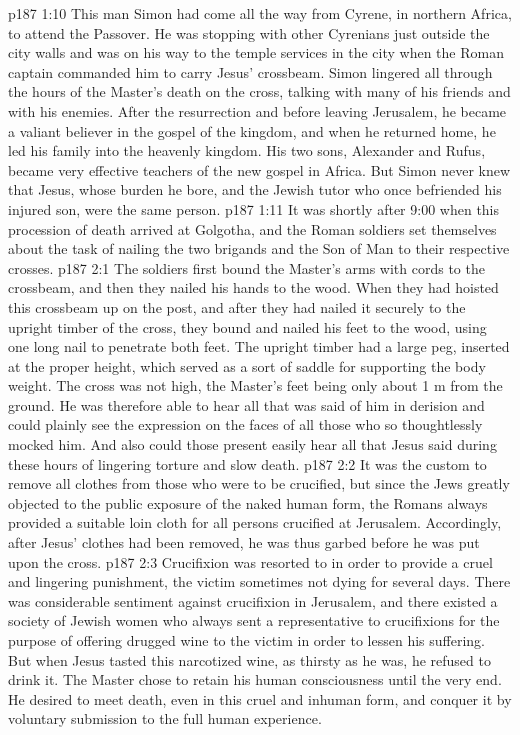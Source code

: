 \vs p187 1:10 \pc This man Simon had come all the way from Cyrene, in northern Africa, to attend the Passover. He was stopping with other Cyrenians just outside the city walls and was on his way to the temple services in the city when the Roman captain commanded him to carry Jesus’ crossbeam. Simon lingered all through the hours of the Master’s death on the cross, talking with many of his friends and with his enemies. After the resurrection and before leaving Jerusalem, he became a valiant believer in the gospel of the kingdom, and when he returned home, he led his family into the heavenly kingdom. His two sons, Alexander and Rufus, became very effective teachers of the new gospel in Africa. But Simon never knew that Jesus, whose burden he bore, and the Jewish tutor who once befriended his injured son, were the same person.
\vs p187 1:11 \pc It was shortly after 9:00 when this procession of death arrived at Golgotha, and the Roman soldiers set themselves about the task of nailing the two brigands and the Son of Man to their respective crosses.
\vs p187 2:1 The soldiers first bound the Master’s arms with cords to the crossbeam, and then they nailed his hands to the wood. When they had hoisted this crossbeam up on the post, and after they had nailed it securely to the upright timber of the cross, they bound and nailed his feet to the wood, using one long nail to penetrate both feet. The upright timber had a large peg, inserted at the proper height, which served as a sort of saddle for supporting the body weight. The cross was not high, the Master’s feet being only about 1 m from the ground. He was therefore able to hear all that was said of him in derision and could plainly see the expression on the faces of all those who so thoughtlessly mocked him. And also could those present easily hear all that Jesus said during these hours of lingering torture and slow death.
\vs p187 2:2 It was the custom to remove all clothes from those who were to be crucified, but since the Jews greatly objected to the public exposure of the naked human form, the Romans always provided a suitable loin cloth for all persons crucified at Jerusalem. Accordingly, after Jesus’ clothes had been removed, he was thus garbed before he was put upon the cross.
\vs p187 2:3 Crucifixion was resorted to in order to provide a cruel and lingering punishment, the victim sometimes not dying for several days. There was considerable sentiment against crucifixion in Jerusalem, and there existed a society of Jewish women who always sent a representative to crucifixions for the purpose of offering drugged wine to the victim in order to lessen his suffering. But when Jesus tasted this narcotized wine, as thirsty as he was, he refused to drink it. The Master chose to retain his human consciousness until the very end. He desired to meet death, even in this cruel and inhuman form, and conquer it by voluntary submission to the full human experience.
